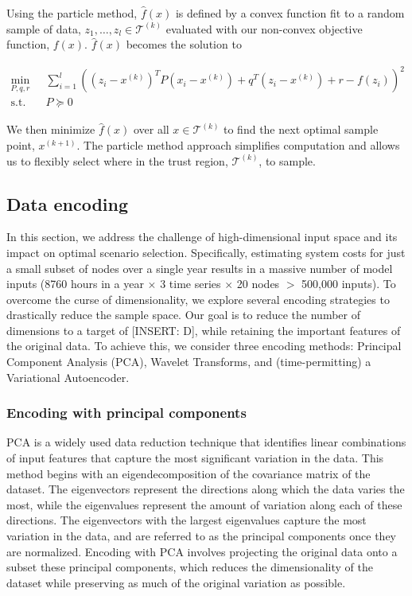 \documentclass[10pt,twocolumn,letterpaper]{article}
\begin{document}
Using the particle method, $\hat{f}(x)$ is defined by a convex function fit to a random sample of data, $z_1, \dots, z_l \in \mathcal{T}^{(k)}$ evaluated with our non-convex objective function, $f(x)$. $\hat{f}(x)$ becomes the solution to
\begin{small}\begin{align*}
    \min_{P, q, r} \;\; & \sum_{i=1}^l \left((z_i - x^{(k)})^TP(x_i - x^{(k)}) + q^T(z_i - x^{(k)}) + r - f(z_i)\right)^2\\
    \textrm{s.t.} \quad & P \succeq 0
\end{align*}\end{small}

We then minimize $\hat{f}(x)$ over all $x \in \mathcal{T}^{(k)}$ to find the next optimal sample point, $x^{(k+1)}$. The particle method approach simplifies computation and allows us to flexibly select where in the trust region, $\mathcal{T}^{(k)}$, to sample.







\subsection{Data encoding}
In this section, we address the challenge of high-dimensional input space and its impact on optimal scenario selection. Specifically, estimating system costs for just a small subset of nodes over a single year results in a massive number of model inputs (8760 hours in a year $\times$ 3 time series $\times$ 20 nodes $>$ 500,000 inputs). To overcome the curse of dimensionality, we explore several encoding strategies to drastically reduce the sample space. Our goal is to reduce the number of dimensions to a target of [INSERT: D], while retaining the important features of the original data. To achieve this, we consider three encoding methods: Principal Component Analysis (PCA), Wavelet Transforms, and (time-permitting) a Variational Autoencoder.

\subsubsection{Encoding with principal components}
PCA is a widely used data reduction technique that identifies linear combinations of input features that capture the most significant variation in the data. This method begins with an eigendecomposition of the covariance matrix of the dataset. The eigenvectors represent the directions along which the data varies the most, while the eigenvalues represent the amount of variation along each of these directions. The eigenvectors with the largest eigenvalues capture the most variation in the data, and are referred to as the principal components once they are normalized. Encoding with PCA involves projecting the original data onto a subset these principal components, which reduces the dimensionality of the dataset while preserving as much of the original variation as possible.
\end{document}
